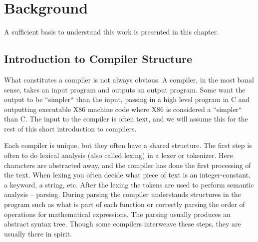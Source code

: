 \documentclass[msc,lith,english]{liuthesis}
\begin{document}
\chapter{Background}
\label{chaBackground}
A sufficient basis to understand this work is presented in this chapter.

% 


\section{Introduction to Compiler Structure}
What constitutes a compiler is not always obvious. A compiler, in the most banal sense, takes an input program and outputs an output program. Some want the output to be ``simpler`` than the input, passing in a high level program in C and outputting executable X86 machine code where X86 is considered a ``simpler`` than C. The input to the compiler is often text, and we will assume this for the rest of this short introduction to compilers.

Each compiler is unique, but they often have a shared structure. The first step is often to do lexical analysis (also called lexing) in a lexer or tokenizer. Here characters are abstracted away, and the compiler has done the first processing of the text. When lexing you often decide what piece of text is an integer-constant, a keyword, a string, etc. After the lexing the tokens are used to perform semantic analysis -- parsing. During parsing the compiler understands structures in the program such as what is part of each function or correctly parsing the order of operations for mathematical expressions. The parsing usually produces an abstract syntax tree. Though some compilers interweave these steps, they are usually there in spirit.
\end{document}
